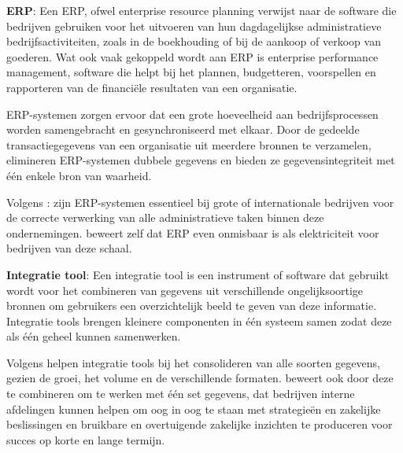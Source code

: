 \textbf{ERP}: Een ERP, ofwel enterprise resource planning verwijst naar de software die bedrijven gebruiken voor het uitvoeren van hun dagdagelijkse administratieve bedrijfsactiviteiten, zoals in de boekhouding of bij de aankoop of verkoop van goederen. Wat ook vaak gekoppeld wordt aan ERP is enterprise performance management, software die helpt bij het plannen, budgetteren, voorspellen en rapporteren van de financiële resultaten van een organisatie. \autocite{Oracle2017}

\vspace{\baselineskip}

ERP-systemen zorgen ervoor dat een grote hoeveelheid aan bedrijfsprocessen worden samengebracht en gesynchroniseerd met elkaar. Door de gedeelde transactiegegevens van een organisatie uit meerdere bronnen te verzamelen, elimineren ERP-systemen dubbele gegevens en bieden ze gegevensintegriteit met één enkele bron van waarheid. \autocite{Oracle2017}

\vspace{\baselineskip}

Volgens \textcite{Oracle2017}: zijn ERP-systemen essentieel bij grote of internationale bedrijven voor de correcte verwerking van alle administratieve taken binnen deze ondernemingen. \textcite{Oracle2017} beweert zelf dat ERP even onmisbaar is als elektriciteit voor bedrijven van deze schaal.

\vspace{\baselineskip}

\textbf{Integratie tool}: Een integratie tool is een instrument of software dat gebruikt wordt voor het combineren van gegevens uit verschillende ongelijksoortige bronnen om gebruikers een overzichtelijk beeld te geven van deze informatie. Integratie tools brengen kleinere componenten in één systeem samen zodat deze als één geheel kunnen samenwerken. \autocite{Microsoft2024}

\vspace{\baselineskip}

Volgens \textcite{Microsoft2024} helpen integratie tools bij het consolideren van alle soorten gegevens, gezien de groei, het volume en de verschillende formaten. \textcite{Microsoft2024} beweert ook door deze te combineren om te werken met één set gegevens, dat bedrijven interne afdelingen kunnen helpen om oog in oog te staan met strategieën en zakelijke beslissingen en bruikbare en overtuigende zakelijke inzichten te produceren voor succes op korte en lange termijn.



